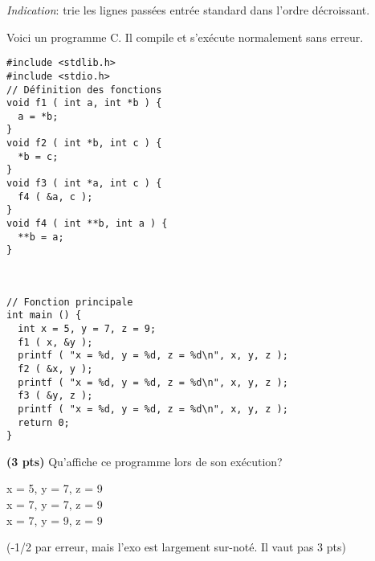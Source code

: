 \documentclass[10pt]{article}
\begin{document}
\begin{Exercice}
%

  \noindent \textit{Indication}:  trie les lignes passées entrée
  standard dans l'ordre décroissant.
\end{Exercice}

\newpage
\begin{Exercice}
  Voici un programme C. Il compile et s'exécute normalement sans erreur.

  \begin{minipage}{.35\linewidth}
  \begin{Verbatim}
#include <stdlib.h>
#include <stdio.h>
// Définition des fonctions
void f1 ( int a, int *b ) {
  a = *b;
}
void f2 ( int *b, int c ) {
  *b = c;
}
void f3 ( int *a, int c ) {
  f4 ( &a, c );
}
void f4 ( int **b, int a ) {
  **b = a;
}
  \end{Verbatim}
  \end{minipage}~~~~
  \begin{minipage}{.6\linewidth}
  \begin{Verbatim}
// Fonction principale
int main () {
  int x = 5, y = 7, z = 9;
  f1 ( x, &y );
  printf ( "x = %d, y = %d, z = %d\n", x, y, z );
  f2 ( &x, y );
  printf ( "x = %d, y = %d, z = %d\n", x, y, z );
  f3 ( &y, z );
  printf ( "x = %d, y = %d, z = %d\n", x, y, z );
  return 0;
}    
  \end{Verbatim}    
  \end{minipage}

\Question \textbf{(3 pts)}  Qu'affiche ce programme lors de son exécution?
\begin{Reponse}
\noindent x = 5, y = 7, z = 9\\
x = 7, y = 7, z = 9\\
x = 7, y = 9, z = 9

(-1/2 par erreur, mais l'exo est largement sur-noté. Il vaut pas 3 pts)
\end{Reponse}
\end{Exercice}
\end{document}
